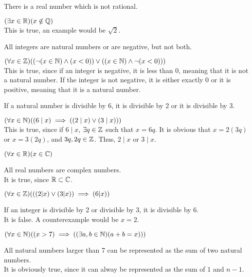 \documentclass[11pt]{article}
\begin{document}
\begin{Parts}
	
	\Part There is a real number which is not rational.

	\begin{Answer}
		$(\exists x \in \mathbb{R})(x \notin \mathbb{Q})$ \\ 
		This is true, an example would be $\sqrt{2}$. 
	\end{Answer}

	\Part All integers are natural numbers or are negative, but not both.

	\begin{Answer}
		$(\forall x \in \mathbb{Z})((\neg (x \in \mathbb{N}) \land (x < 0)) \lor ((x \in \mathbb{N}) \land \neg (x < 0)))$ \\
		This is true, since if an integer is negative, it is less than $0$, meaning that it is not
		a natural number. If the integer is not negative, it is either exactly $0$ or it is positive, 
		meaning that it is a natural number. 
	\end{Answer}

	\Part If a natural number is divisible by 6, it is divisible by 2 or it is divisible by 3.

	\begin{Answer}
		$(\forall x \in \mathbb{N})((6 \mid x) \implies ((2 \mid x) \lor (3 \mid x)))$ \\ 
		This is true, since if $6 \mid x$, $\exists q \in \mathbb{Z}$ such that $x=6q$. It is obvious that 
		$x=2(3q)$ or $x=3(2q)$, and $3q,2q \in \mathbb{Z}$. Thus, $2 \mid x$ or $3 \mid x$.
	\end{Answer}
	
	\Part $(\forall x \in \mathbb{R})(x \in \mathbb{C})$

	\begin{Answer}
		All real numbers are complex numbers. \\
		It is true, since $\mathbb{R} \subset \mathbb{C}$. 
	\end{Answer}

	\Part $(\forall x \in \mathbb{Z})(((2|x) \lor (3|x)) \implies (6|x))$

	\begin{Answer}
		If an integer is divisible by 2 or divisible by 3, it is divisible by 6. \\ 
		It is false. A counterexample would be $x=2$. 
	\end{Answer}

	\Part $(\forall x \in \mathbb{N})((x>7) \implies ((\exists a,b \in \mathbb{N})(a+b=x)))$

	\begin{Answer}
		All natural numbers larger than 7 can be represented as the sum of two natural numbers. \\
		It is obviously true, since it can alway be represented as the sum of $1$ and $n-1$. 
	\end{Answer}
	
\end{Parts}
\end{document}
